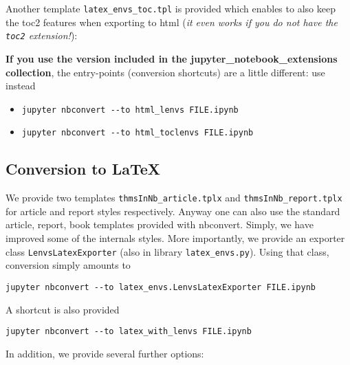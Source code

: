 Another template \texttt{latex\_envs\_toc.tpl} is provided which enables
to also keep the toc2 features when exporting to html (\emph{it even
works if you do not have the \texttt{toc2} extension!}):

\begin{Shaded}
\begin{Highlighting}[]
 
\end{Highlighting}
\end{Shaded}

\textbf{If you use the version included in the
jupyter\_notebook\_extensions collection}, the entry-points (conversion
shortcuts) are a little different: use instead

\begin{itemize}
\item
\begin{verbatim}
jupyter nbconvert --to html_lenvs FILE.ipynb
\end{verbatim}
\item
\begin{verbatim}
jupyter nbconvert --to html_toclenvs FILE.ipynb
\end{verbatim}
\end{itemize}

\subsection{Conversion to LaTeX}\label{conversion-to-latex}

We provide two templates \texttt{thmsInNb\_article.tplx} and
\texttt{thmsInNb\_report.tplx} for article and report styles
respectively. Anyway one can also use the standard article, report, book
templates provided with nbconvert. Simply, we have improved some of the
internals styles. More importantly, we provide an exporter class
\texttt{LenvsLatexExporter} (also in library \texttt{latex\_envs.py}).
Using that class, conversion simply amounts to

\begin{verbatim}
jupyter nbconvert --to latex_envs.LenvsLatexExporter FILE.ipynb
\end{verbatim}

A shortcut is also provided

\begin{verbatim}
jupyter nbconvert --to latex_with_lenvs FILE.ipynb
\end{verbatim}

In addition, we provide several further options:

